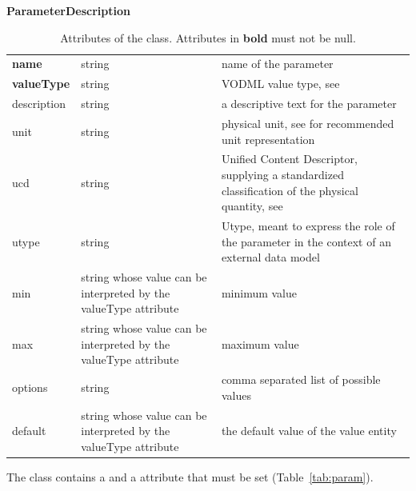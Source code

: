 \begin{table}[ht]
\small
{}\textwidth
\textbf{\normalsize ParameterDescription}\vspace{0.25em}\\
\begin{tabulary}{1.0\textwidth}{lLL}
 \toprule
  &    & \\
 \midrule
\textbf{name} & string & name of the parameter \\
\textbf{valueType} & string & VODML value type, see \citet{std:VODML} \\
description & string  & a descriptive text for the parameter \\
unit        & string  & physical unit, see \citet{std:VOUNIT} for recommended unit representation \\
ucd         & string  & Unified Content Descriptor, supplying a standardized classification of the physical quantity, see \citet{std:UCD13} \\
utype       & string  & Utype, meant to express the role of the parameter in the context of an external data model \\
min         & string whose value can be interpreted by the valueType attribute & minimum value \\
max         & string whose value can be interpreted by the valueType attribute & maximum value\\
options     & string & comma separated list of possible values\\
default     & string whose value can be interpreted by the valueType attribute & the default value of the value entity \\
\bottomrule
\end{tabulary}
\caption[Attributes of the  class]{Attributes of the   class. Attributes in \textbf{bold} must not be null.}
\label{tab:Paramdescription}
\end{table}

The  class contains a  and a  attribute that must be set (Table~\ref{tab:param}).

